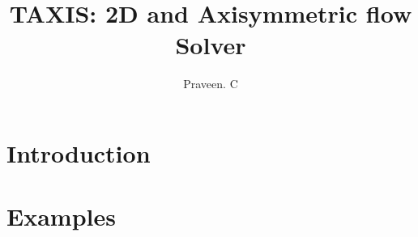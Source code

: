 \documentclass[12pt]{report}
\title{TAXIS: 2D and Axisymmetric flow Solver}
\author{Praveen. C}
\begin{document}
\maketitle
\tableofcontents

\chapter{Introduction}

\chapter{Examples}
\end{document}
